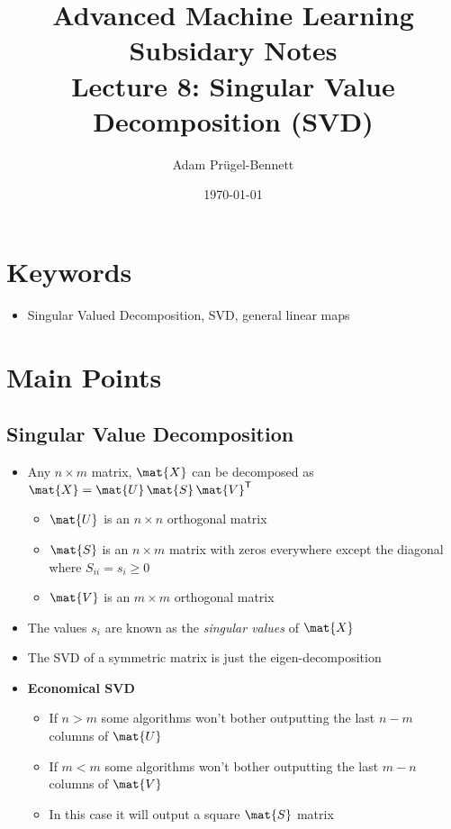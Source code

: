 \documentclass[11pt]{article}
\author{Adam Prügel-Bennett}
\date{\today}
\title{Advanced Machine Learning Subsidary Notes\\\medskip
\large Lecture 8: Singular Value Decomposition (SVD)}
\newcommand{\tr}{\textsf{T}}
\begin{document}
\maketitle


\section{Keywords}
\label{sec:org44b11d0}
\begin{itemize}
\item Singular Valued Decomposition, SVD, general linear maps
\end{itemize}

\section{Main Points}
\label{sec:orgf56122b}

\subsection{Singular Value Decomposition}
\label{sec:org7174bd8}
\begin{itemize}
\item Any \(n\times m\) matrix, \(\mat{X}\) can be decomposed as \(\mat{X} = \mat{U}\,\mat{S}\,\mat{V}^\tr\)
\begin{itemize}
\item \(\mat{U}\) is an \(n\times n\) orthogonal matrix
\item \(\mat{S}\) is an \(n\times m\)  matrix with zeros everywhere except the diagonal where \(S_{ii}=s_i\geq0\)
\item \(\mat{V}\) is an \(m\times m\) orthogonal matrix
\end{itemize}
\item The values \(s_i\) are known as the \emph{singular values} of \(\mat{X}\)
\item The SVD of a symmetric matrix is just the eigen-decomposition
\item \textbf{Economical SVD}
\begin{itemize}
\item If \(n>m\) some algorithms won't bother outputting the last \(n-m\) columns of \(\mat{U}\)
\item If \(m<m\) some algorithms won't bother outputting the last \(m-n\) columns of \(\mat{V}\)
\item In this case it will output a square \(\mat{S}\) matrix
\end{itemize}
\end{itemize}
\end{document}
